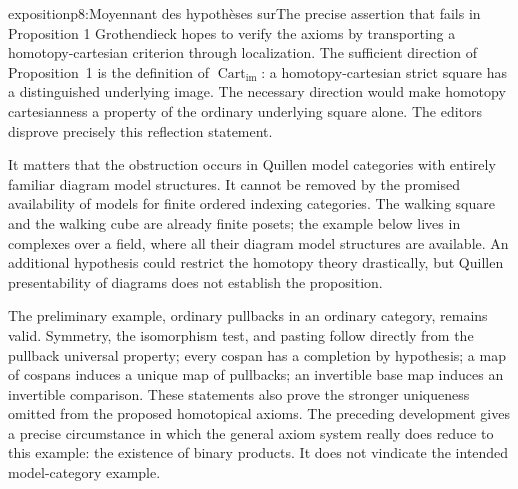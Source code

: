 \begin{dcomment}{exposition}{p8:Moyennant des hypothèses sur}{The precise assertion that fails in Proposition 1}
Grothendieck hopes to verify the axioms by transporting a homotopy-cartesian criterion through localization. The sufficient direction of Proposition~1 is the definition of $\operatorname{Cart}_{\mathrm{im}}$: a homotopy-cartesian strict square has a distinguished underlying image. The necessary direction would make homotopy cartesianness a property of the ordinary underlying square alone. The editors disprove precisely this reflection statement.

It matters that the obstruction occurs in Quillen model categories with entirely familiar diagram model structures. It cannot be removed by the promised availability of models for finite ordered indexing categories. The walking square and the walking cube are already finite posets; the example below lives in complexes over a field, where all their diagram model structures are available. An additional hypothesis could restrict the homotopy theory drastically, but Quillen presentability of diagrams does not establish the proposition.

The preliminary example, ordinary pullbacks in an ordinary category, remains valid. Symmetry, the isomorphism test, and pasting follow directly from the pullback universal property; every cospan has a completion by hypothesis; a map of cospans induces a unique map of pullbacks; an invertible base map induces an invertible comparison. These statements also prove the stronger uniqueness omitted from the proposed homotopical axioms. The preceding development gives a precise circumstance in which the general axiom system really does reduce to this example: the existence of binary products. It does not vindicate the intended model-category example.
\end{dcomment}

